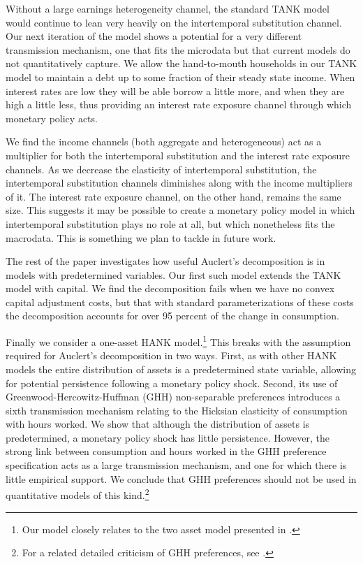 \documentclass[titlepage]{\econtex}\newcommand{\texname}{ConsumptionHeterogeneity}
\begin{document}
Without a large earnings heterogeneity channel, the standard TANK model would continue to lean very heavily on the intertemporal substitution channel. Our next iteration of the model shows a potential for a very different transmission mechanism, one that fits the microdata but that current models do not quantitatively capture. We allow the hand-to-mouth households in our TANK model to maintain a debt up to some fraction of their steady state income. When interest rates are low they will be able borrow a little more, and when they are high a little less, thus providing an interest rate exposure channel through which monetary policy acts.

We find the income channels (both aggregate and heterogeneous) act as a multiplier for both the intertemporal substitution and the interest rate exposure channels. As we decrease the elasticity of intertemporal substitution, the intertemporal substitution channels diminishes along with the income multipliers of it. The interest rate exposure channel, on the other hand, remains the same size. This suggests it may be possible to create a monetary policy model in which intertemporal substitution plays no role at all, but which nonetheless fits the macrodata. This is something we plan to tackle in future work.

The rest of the paper investigates how useful Auclert's decomposition is in models with predetermined variables. Our first such model extends the  TANK model with capital. We find the decomposition fails when we have no convex capital adjustment costs, but that with standard parameterizations of these costs the decomposition accounts for over 95 percent of the change in consumption.

Finally we consider a one-asset HANK model.\footnote{Our model closely relates to the two asset model presented in \cite{blSolving}.} This breaks with the assumption required for Auclert's decomposition in two ways. First, as with other HANK models the entire distribution of assets is a predetermined state variable, allowing for potential persistence following a monetary policy shock. Second, its use of Greenwood-Hercowitz-Huffman (GHH) non-separable preferences introduces a sixth transmission mechanism relating to the Hicksian elasticity of consumption with hours worked. We show that although the distribution of assets is predetermined, a monetary policy shock has little persistence. However, the strong link between consumption and hours worked in the GHH preference specification acts as a large transmission mechanism, and one for which there is little empirical support. We conclude that GHH preferences should not be used in quantitative models of this kind.\footnote{For a related detailed criticism of GHH preferences, see \cite{arGHH}.}
\end{document}
